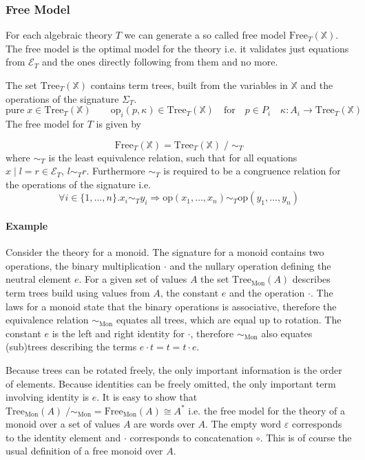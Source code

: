 \subsubsection{Free Model}

For each algebraic theory $T$ we can generate a so called free model
$\mathrm{Free}_T(\mathbb{X})$.
The free model is the optimal model for the theory i.e. it validates just
equations from $\mathcal{E}_T$ and the ones directly following from them and no
more.

The set $\mathrm{Tree}_T(\mathbb{X})$ contains term trees, built from the
variables in $\mathbb{X}$ and the operations of the signature $\Sigma_T$.
\[
  \mathrm{pure}\;x \in \mathrm{Tree}_T(\mathbb{X}) \qquad \mathrm{op}_i(p,\kappa)
  \in \mathrm{Tree}_T(\mathbb{X}) \quad\text{for}\quad p\in P_i \quad \kappa :
  A_i \rightarrow \mathrm{Tree}_T(\mathbb{X})
\]
The free model for $T$ is given by

\[
  \mathrm{Free}_T(\mathbb{X}) = \mathrm{Tree}_T(\mathbb{X})\; /\;\sim_T
\]
where $\sim_T$ is the least equivalence relation, such that for all equations
$x\;|\;l=r\in\mathcal{E}_T$, $l\sim_T r$.
Furthermore $\sim_T$ is required to be a congruence relation for the operations
of the signature i.e.
\[
  \forall i\in\{1,\dots ,n\}. x_i\sim_T y_i \Rightarrow \mathrm{op}(x_1,\dots , x_n)
  \sim_T \mathrm{op}(y_1,\dots , y_n)
\]

\paragraph{Example}

Consider the theory for a monoid.
The signature for a monoid contains two operations, the binary multiplication $\cdot$
and the nullary operation defining the neutral element $e$.
For a given set of values $A$ the set $\mathrm{Tree}_{\mathrm{Mon}}(A)$ describes term trees
build using values from $A$, the constant $e$ and the operation $\cdot$.
The laws for a monoid state that the binary operations is associative, therefore
the equivalence relation $\sim_{\mathrm{Mon}}$ equates all trees, which are
equal up to rotation.
The constant $e$ is the left and right identity for $\cdot$, therefore
$\sim_{\mathrm{Mon}}$ also equates (sub)trees describing the terms $e\cdot t = t
= t \cdot e$.

Because trees can be rotated freely, the only important information is the order
of elements.
Because identities can be freely omitted, the only important term involving
identity is $e$.
It is easy to show that $\mathrm{Tree}_{\mathrm{Mon}}(A)
\;/\sim_{\mathrm{Mon}} = \mathrm{Free}_{\mathrm{Mon}}(A) \cong A^*$ i.e. the
free model for the theory of a monoid over a set of values $A$ are words over
$A$.
The empty word $\varepsilon$ corresponds to the identity element and $\cdot$
corresponds to concatenation $\circ$.
This is of course the usual definition of a free monoid over $A$.


